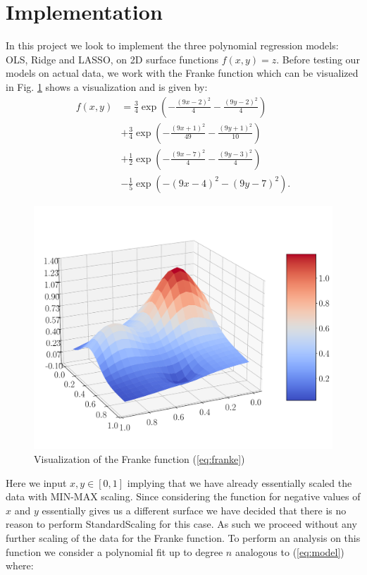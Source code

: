 \documentclass[%
reprint,
amsmath,amssymb,
aps,
pra,
]{revtex4-2}
\begin{document}
\section{Implementation}
In this project we look to implement the three polynomial regression models: OLS, Ridge and  LASSO, on 2D surface functions \(f(x,y)=z\). Before testing our models on actual data, we work with the Franke function which can be visualized in Fig. \ref{fig:frankefunction} shows a visualization and is given by:
\begin{align}	\label{eq:franke}
	f(x,y)&=\frac{3}{4}\exp(-\frac{(9x-2)^2}{4}-\frac{(9y-2)^2}{4})\nonumber\\
	&+\frac{3}{4}\exp(-\frac{(9x+1)^2}{49}-\frac{(9y+1)^2}{10})\nonumber\\
	&+\frac{1}{2}\exp(-\frac{(9x-7)^2}{4}-\frac{(9y-3)^2}{4})\nonumber\\
	&-\frac{1}{5}\exp(-(9x-4)^2-(9y-7)^2).
\end{align}
\begin{figure}[H]
	\includegraphics[width=\linewidth]{Python/Figures/FrankeFunction.pdf}
	\caption{Visualization of the Franke function (\ref{eq:franke})}
	\label{fig:frankefunction}
\end{figure}
Here we input $x,y\in[0,1]$ implying that we have already essentially scaled the data with MIN-MAX scaling. Since considering the function for negative values of $x$ and $y$ essentially gives us a different surface we have decided that there is no reason to perform StandardScaling for this case. As such we proceed without any further scaling of the data for the Franke function. To perform an analysis on this function we consider a polynomial fit up to degree $n$ analogous to (\ref{eq:model}) where:
\end{document}
